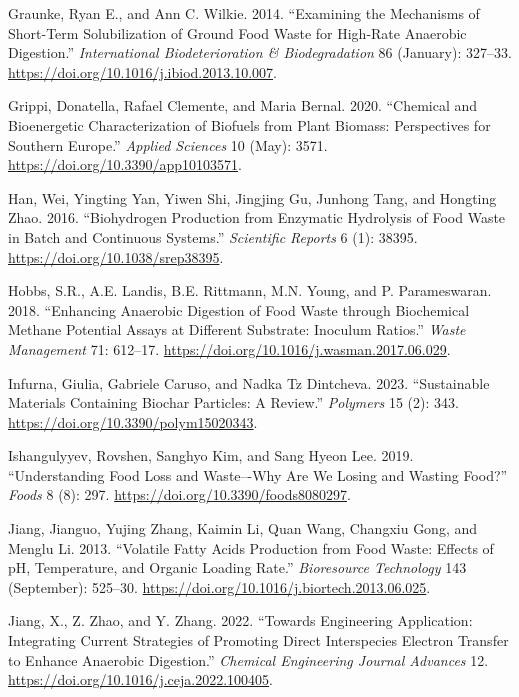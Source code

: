 \documentclass[11pt]{report}
\begin{document}
\begin{hangparas}{1.5em}{1}
\hypertarget{citeproc_bib_item_24}{Graunke, Ryan E., and Ann C. Wilkie. 2014. “Examining the Mechanisms of Short-Term Solubilization of Ground Food Waste for High-Rate Anaerobic Digestion.” \textit{International Biodeterioration \& Biodegradation} 86 (January): 327–33. \url{https://doi.org/10.1016/j.ibiod.2013.10.007}.}

\hypertarget{citeproc_bib_item_25}{Grippi, Donatella, Rafael Clemente, and Maria Bernal. 2020. “Chemical and Bioenergetic Characterization of Biofuels from Plant Biomass: Perspectives for Southern Europe.” \textit{Applied Sciences} 10 (May): 3571. \url{https://doi.org/10.3390/app10103571}.}

\hypertarget{citeproc_bib_item_26}{Han, Wei, Yingting Yan, Yiwen Shi, Jingjing Gu, Junhong Tang, and Hongting Zhao. 2016. “Biohydrogen Production from Enzymatic Hydrolysis of Food Waste in Batch and Continuous Systems.” \textit{Scientific Reports} 6 (1): 38395. \url{https://doi.org/10.1038/srep38395}.}

\hypertarget{citeproc_bib_item_27}{Hobbs, S.R., A.E. Landis, B.E. Rittmann, M.N. Young, and P. Parameswaran. 2018. “Enhancing Anaerobic Digestion of Food Waste through Biochemical Methane Potential Assays at Different Substrate: Inoculum Ratios.” \textit{Waste Management} 71: 612–17. \url{https://doi.org/10.1016/j.wasman.2017.06.029}.}

\hypertarget{citeproc_bib_item_28}{Infurna, Giulia, Gabriele Caruso, and Nadka Tz Dintcheva. 2023. “Sustainable Materials Containing Biochar Particles: A Review.” \textit{Polymers} 15 (2): 343. \url{https://doi.org/10.3390/polym15020343}.}

\hypertarget{citeproc_bib_item_29}{Ishangulyyev, Rovshen, Sanghyo Kim, and Sang Hyeon Lee. 2019. “Understanding Food Loss and Waste–-Why Are We Losing and Wasting Food?” \textit{Foods} 8 (8): 297. \url{https://doi.org/10.3390/foods8080297}.}

\hypertarget{citeproc_bib_item_30}{Jiang, Jianguo, Yujing Zhang, Kaimin Li, Quan Wang, Changxiu Gong, and Menglu Li. 2013. “Volatile Fatty Acids Production from Food Waste: Effects of pH, Temperature, and Organic Loading Rate.” \textit{Bioresource Technology} 143 (September): 525–30. \url{https://doi.org/10.1016/j.biortech.2013.06.025}.}

\hypertarget{citeproc_bib_item_31}{Jiang, X., Z. Zhao, and Y. Zhang. 2022. “Towards Engineering Application: Integrating Current Strategies of Promoting Direct Interspecies Electron Transfer to Enhance Anaerobic Digestion.” \textit{Chemical Engineering Journal Advances} 12. \url{https://doi.org/10.1016/j.ceja.2022.100405}.}


\end{hangparas}
\end{document}
